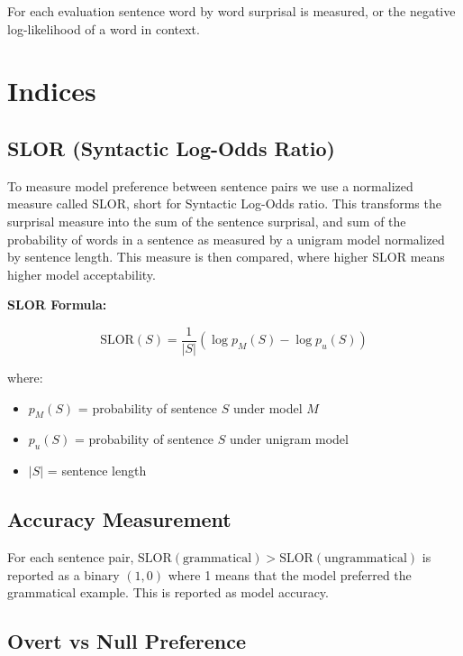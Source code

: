 \documentclass[12pt]{article}
\begin{document}
For each evaluation sentence word by word surprisal is measured, or the negative log-likelihood of a word in context.

\section{Indices}

\subsection{SLOR (Syntactic Log-Odds Ratio)}

To measure model preference between sentence pairs we use a normalized measure called SLOR, short for Syntactic Log-Odds ratio. This transforms the surprisal measure into the sum of the sentence surprisal, and sum of the probability of words in a sentence as measured by a unigram model normalized by sentence length. This measure is then compared, where higher SLOR means higher model acceptability.

\textbf{SLOR Formula:}

\begin{equation}
    \text{SLOR}(S) = \frac{1}{|S|} \left( \log p_M(S) - \log p_u(S) \right)
\end{equation}

where:
\begin{itemize}
    \item $p_M(S)$ = probability of sentence $S$ under model $M$
    \item $p_u(S)$ = probability of sentence $S$ under unigram model
    \item $|S|$ = sentence length
\end{itemize}

\subsection{Accuracy Measurement}

For each sentence pair, $\text{SLOR}(\text{grammatical}) > \text{SLOR}(\text{ungrammatical})$ is reported as a binary $(1,0)$ where 1 means that the model preferred the grammatical example. This is reported as model accuracy.

\subsection{Overt vs Null Preference}
\end{document}

